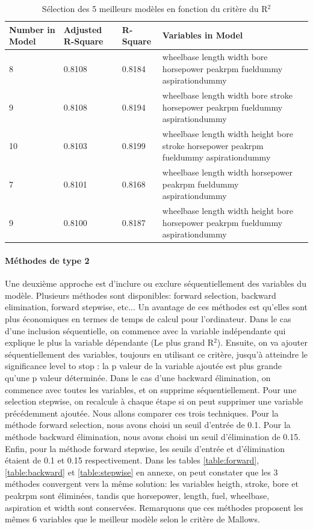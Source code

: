 \documentclass[11pt,a4paper]{article}
\begin{document}
\begin{table}
\small
\begin{tabulary}{1\textwidth}{LLLJ}\hline
	
	Number in  Model &    Adjusted  R-Square &    R-Square &    Variables in Model\\\hline

	  8 &    0.8108 &    0.8184 &    wheelbase length width bore horsepower peakrpm fueldummy aspirationdummy\\
	9 &    0.8108 &    0.8194 &    wheelbase length width bore stroke horsepower peakrpm fueldummy aspirationdummy\\
	10 &    0.8103 &    0.8199 &    wheelbase length width height bore stroke horsepower peakrpm fueldummy aspirationdummy\\
	7 &    0.8101 &    0.8168 &    wheelbase length width horsepower peakrpm fueldummy aspirationdummy\\
	9 &    0.8100 &    0.8187 &    wheelbase length width height bore horsepower peakrpm fueldummy aspirationdummy\\\hline
	
\end{tabulary}
\caption{Sélection des 5 meilleurs modèles en fonction du critère du R$^2$}
\label{table:adjsqr}
\end{table}


\paragraph{Méthodes de type 2}Une deuxième approche est d'inclure ou exclure séquentiellement des variables du modèle. Plusieurs méthodes sont disponibles: forward selection, backward elimination, forward stepwise, etc... Un avantage de ces méthodes est qu'elles sont plus économiques en termes de temps de calcul pour l'ordinateur. Dans le cas d'une inclusion séquentielle, on commence avec la variable indépendante qui explique le plus la variable dépendante (Le plus grand R$^{2}$). Ensuite, on va ajouter séquentiellement des variables, toujours en utilisant ce critère, jusqu'à atteindre le significance level to stop : la p valeur de la variable ajoutée est plus grande qu'une p valeur déterminée. Dans le cas d'une backward élimination, on commence avec toutes les variables, et on supprime séquentiellement. Pour une selection stepwise, on recalcule à chaque étape si on peut supprimer une variable précédemment ajoutée. Nous allons comparer ces trois techniques. Pour la méthode forward selection, nous avons choisi un seuil d'entrée de 0.1. Pour la méthode backward élimination, nous avons choisi un seuil d'élimination de 0.15. Enfin, pour la méthode forward stepwise, les seuils d'entrée et d'élimination étaient de 0.1 et 0.15 respectivement. Dans les tables \ref{table:forward}, \ref{table:backward} et \ref{table:stepwise} en annexe, on peut constater que les 3 méthodes convergent vers la même solution: les variables heigth, stroke, bore et peakrpm sont éliminées, tandis que horsepower, length, fuel, wheelbase, aspiration et width sont conservées. Remarquons que ces méthodes proposent les mêmes 6 variables que le meilleur modèle selon le critère de Mallows.
\end{document}
